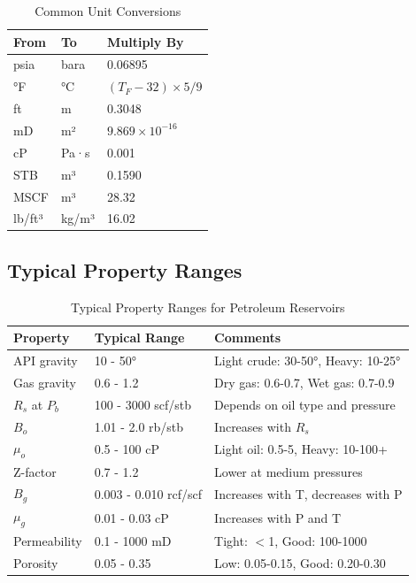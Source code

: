 \documentclass[11pt,a4paper]{article}
\begin{document}
\begin{table}[h]
\centering
\begin{tabular}{lll}
\toprule
\textbf{From} & \textbf{To} & \textbf{Multiply By} \\
\midrule
psia & bara & 0.06895 \\
°F & °C & $(T_F - 32) \times 5/9$ \\
ft & m & 0.3048 \\
mD & m² & $9.869 \times 10^{-16}$ \\
cP & Pa·s & 0.001 \\
STB & m³ & 0.1590 \\
MSCF & m³ & 28.32 \\
lb/ft³ & kg/m³ & 16.02 \\
\bottomrule
\end{tabular}
\caption{Common Unit Conversions}
\end{table}

\subsection{Typical Property Ranges}

\begin{table}[h]
\centering
\begin{tabular}{lll}
\toprule
\textbf{Property} & \textbf{Typical Range} & \textbf{Comments} \\
\midrule
API gravity & 10 - 50° & Light crude: 30-50°, Heavy: 10-25° \\
Gas gravity & 0.6 - 1.2 & Dry gas: 0.6-0.7, Wet gas: 0.7-0.9 \\
$R_s$ at $P_b$ & 100 - 3000 scf/stb & Depends on oil type and pressure \\
$B_o$ & 1.01 - 2.0 rb/stb & Increases with $R_s$ \\
$\mu_o$ & 0.5 - 100 cP & Light oil: 0.5-5, Heavy: 10-100+ \\
Z-factor & 0.7 - 1.2 & Lower at medium pressures \\
$B_g$ & 0.003 - 0.010 rcf/scf & Increases with T, decreases with P \\
$\mu_g$ & 0.01 - 0.03 cP & Increases with P and T \\
Permeability & 0.1 - 1000 mD & Tight: $<$1, Good: 100-1000 \\
Porosity & 0.05 - 0.35 & Low: 0.05-0.15, Good: 0.20-0.30 \\
\bottomrule
\end{tabular}
\caption{Typical Property Ranges for Petroleum Reservoirs}
\end{table}
\end{document}
